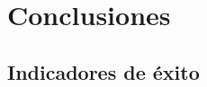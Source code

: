 \documentclass[12pt]{report} %
\begin{document}






\chapter{Conclusiones}

\section{Indicadores de éxito}

\clearpage

\printglossary[type=\acronymtype]

\printglossary




\end{document}

